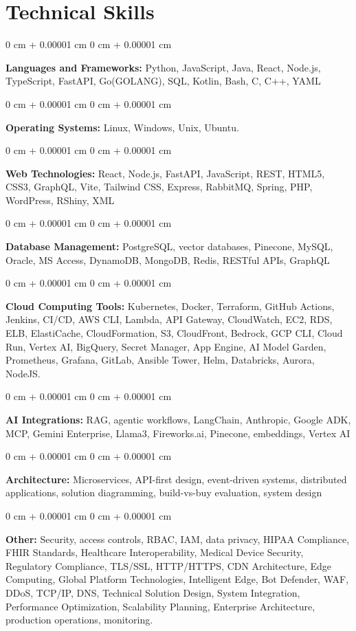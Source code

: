 \documentclass[10pt, letterpaper]{article}
\newenvironment{onecolentry}{
    \begin{adjustwidth}{
        0 cm + 0.00001 cm
    }{
        0 cm + 0.00001 cm
    }
}{
    \end{adjustwidth}
} %
\begin{document}
    \section{Technical Skills}
    \vspace{2 pt }
    \begin{onecolentry}
    \textbf{Languages and Frameworks:} Python, JavaScript, Java, React, Node.js, TypeScript, FastAPI, Go(GOLANG), SQL, Kotlin, Bash, C, C++, YAML
    \end{onecolentry}
    \begin{onecolentry}
        \textbf{Operating Systems:} Linux, Windows, Unix, Ubuntu.
    \end{onecolentry}
    \begin{onecolentry}
         \textbf{Web Technologies:} React, Node.js, FastAPI, JavaScript, REST, HTML5, CSS3, GraphQL, Vite, Tailwind CSS, Express, RabbitMQ, Spring, PHP, WordPress, RShiny, XML
    \end{onecolentry}
    \begin{onecolentry}
        \textbf{Database Management:} PostgreSQL, vector databases, Pinecone, MySQL, Oracle, MS Access, DynamoDB, MongoDB, Redis, RESTful APIs, GraphQL
    \end{onecolentry}
    \begin{onecolentry}
        \textbf{Cloud Computing Tools:}
Kubernetes, Docker, Terraform, GitHub Actions, Jenkins, CI/CD, AWS CLI, Lambda, API Gateway, CloudWatch, EC2, RDS, ELB, ElastiCache, CloudFormation, S3, CloudFront, Bedrock, GCP CLI, Cloud Run, Vertex AI, BigQuery, Secret Manager, App Engine, AI Model Garden, Prometheus, Grafana, GitLab, Ansible Tower, Helm, Databricks, Aurora, NodeJS.
    \end{onecolentry}
    \begin{onecolentry}
         \textbf{AI Integrations:} RAG, agentic workflows, LangChain, Anthropic, Google ADK, MCP, Gemini Enterprise, Llama3, Fireworks.ai, Pinecone, embeddings, Vertex AI
    \end{onecolentry}
    \begin{onecolentry}
        \textbf{Architecture:} Microservices, API-first design, event-driven systems, distributed applications, solution diagramming, build-vs-buy evaluation, system design
    \end{onecolentry}
        \begin{onecolentry}
     \textbf{Other:} Security, access controls, RBAC, IAM, data privacy, HIPAA Compliance, FHIR Standards, Healthcare Interoperability, Medical Device Security, Regulatory Compliance, TLS/SSL, HTTP/HTTPS, CDN Architecture, Edge Computing, Global Platform Technologies, Intelligent Edge, Bot Defender, WAF, DDoS, TCP/IP, DNS, Technical Solution Design, System Integration, Performance Optimization, Scalability Planning, Enterprise Architecture, production operations, monitoring.
    \end{onecolentry}
\end{document}

